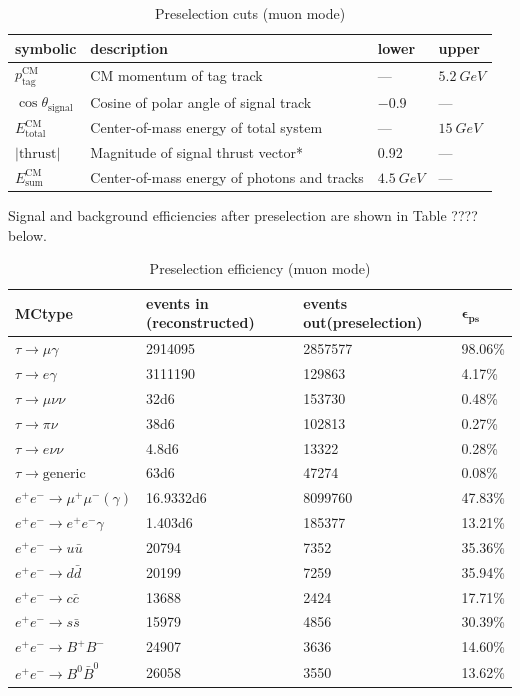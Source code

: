 \documentclass[12pt,a4paper]{article} %
\begin{document}
\begin{table}[h]
\centering
\begin{tabular}{llll}
\textbf{symbolic} & \textbf{description} & \textbf{lower} & \textbf{upper} \\ \hline
$p_{\text{tag}}^{\text{CM}}$  & CM momentum of tag track & --- & $\SI{5.2}{GeV}$ \\
$\cos\theta_{\text{signal}}$ & Cosine of polar angle of signal track & $-0.9$ & --- \\
$E_{\text{total}}^{\text{CM}}$ & Center-of-mass energy of total system  & --- & $\SI{15}{GeV}$ \\
$\lvert\text{thrust}\rvert$ & Magnitude of signal thrust vector* & 0.92 & --- \\
$E_{\text{sum}}^{\text{CM}}$ & Center-of-mass energy of photons and tracks & $\SI{4.5}{GeV}$ & ---
\end{tabular}
\caption{Preselection cuts (muon mode)}
\label{my-label}
\end{table}

Signal and background efficiencies after preselection are shown in Table ???? below.

\begin{table}[h]
\centering
\begin{tabular}{llll}
\textbf{MCtype} & \textbf{events in (reconstructed)} & \textbf{events out(preselection)} & $\mathbf{\epsilon_{\text{ps}}}$\\ \hline
\rowcolor[HTML]{EFEFEF}
$\tau\to\mu\gamma$ & 2914095 & 2857577 & 98.06\%	\\
\rowcolor[HTML]{EFEFEF}
$\tau\to e\gamma$ & 3111190 & 129863 & 4.17\%	\\
$\tau\to\mu\nu\nu$ & \num{32d6} & 153730 & 0.48\%\\
$\tau\to\pi\nu$ & \num{38d6} & 102813 & 0.27\%\\
$\tau\to e\nu\nu$ & \num{4.8d6} & 13322 & 0.28\%\\
$\tau\to\text{generic}$ & \num{63d6} & 47274 & 0.08\%\\
$e^+ e^-\to\mu^+\mu^-(\gamma)$ & \num{16.9332d6} & 8099760 & 47.83\%	\\
$e^+ e^-\to e^+e^-\gamma$ & \num{1.403d6} & 185377 & 13.21\%	\\
$e^+ e^-\to u\bar{u}$ & 20794 & 7352 & 35.36\%	\\
$e^+ e^-\to d\bar{d}$ & 20199 & 7259 & 35.94\%	\\
$e^+ e^-\to c\bar{c}$ & 13688 & 2424 & 17.71\%	\\
$e^+ e^-\to s\bar{s}$ & 15979 & 4856 & 30.39\%	\\
$e^+ e^-\to B^+B^-$ & 24907 & 3636 & 14.60\%	\\
$e^+ e^-\to B^0 \bar{B}^0$ & 26058 & 3550 & 13.62\%
\end{tabular}
\caption{Preselection efficiency (muon mode)}
\label{my-label}
\end{table}
\end{document}
